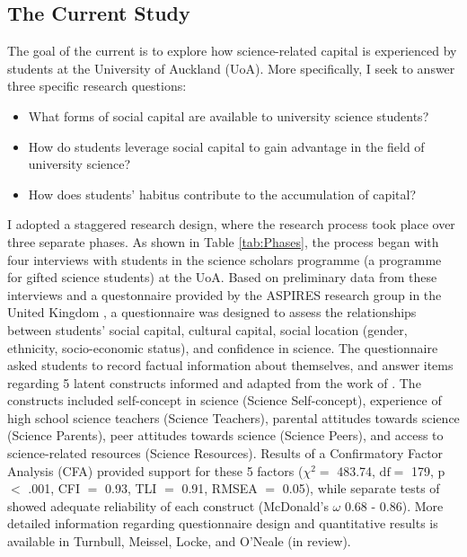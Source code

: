 \subsection{The Current Study}
The goal of the current is to explore how science-related capital is experienced by students at the University of Auckland (UoA). More specifically, I seek to answer three specific research questions:
\begin{itemize}
    \item What forms of social capital are available to university science students? 
    \item How do students leverage social capital to gain advantage in the field of university science? 
    \item How does students' habitus contribute to the accumulation of capital?

\end{itemize}
I adopted a staggered research design, where the research process took place over three separate phases. As shown in Table \ref{tab:Phases}, the process began with four interviews with students in the science scholars programme (a programme for gifted science students) at the UoA. Based on preliminary data from these interviews and a questonnaire provided by the ASPIRES research group in the United Kingdom \citep{dewitt2011high}, a questionnaire was designed to assess the relationships between students' social capital, cultural capital, social location (gender, ethnicity, socio-economic status), and confidence in science. The questionnaire asked students to record factual information about themselves, and answer items regarding 5 latent constructs informed and adapted from the work of \cite{dewitt2011high}. The constructs included self-concept in science (Science Self-concept), experience of high school science teachers (Science Teachers), parental attitudes towards science (Science Parents), peer attitudes towards science (Science Peers), and access to science-related resources (Science Resources). Results of a Confirmatory Factor Analysis (CFA) provided support for these 5 factors ($\chi^{2} =$ 483.74, $\mathrm{df} =$ 179, p $<$ .001, CFI  $=$ 0.93, TLI  $=$ 0.91, RMSEA $=$ 0.05), while separate tests of showed adequate reliability of each construct (McDonald's $\omega$ 0.68 - 0.86). More detailed information regarding questionnaire design and quantitative results is available in Turnbull, Meissel, Locke, and O'Neale (in review). 
